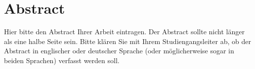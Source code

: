 \chapter*{Abstract} %

Hier bitte den Abstract Ihrer Arbeit eintragen. Der Abstract sollte nicht länger als eine halbe Seite sein. Bitte klären Sie mit Ihrem Studiengangsleiter ab, ob der Abstract in englischer oder deutscher Sprache (oder möglicherweise sogar in beiden Sprachen) verfasst werden soll.
